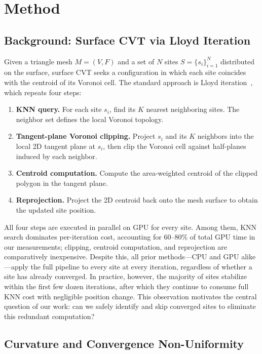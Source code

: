 \section{Method}
\label{sec:method}

\subsection{Background: Surface CVT via Lloyd Iteration}
\label{sec:background}

Given a triangle mesh $M = (V, F)$ and a set of $N$ sites $S = \{s_i\}_{i=1}^N$ distributed on the surface, surface CVT seeks a configuration in which each site coincides with the centroid of its Voronoi cell. The standard approach is Lloyd iteration~\cite{lloyd1982}, which repeats four steps:

\begin{enumerate}
    \item \textbf{KNN query.} For each site $s_i$, find its $K$ nearest neighboring sites. The neighbor set defines the local Voronoi topology.
    \item \textbf{Tangent-plane Voronoi clipping.} Project $s_i$ and its $K$ neighbors into the local 2D tangent plane at $s_i$, then clip the Voronoi cell against half-planes induced by each neighbor.
    \item \textbf{Centroid computation.} Compute the area-weighted centroid of the clipped polygon in the tangent plane.
    \item \textbf{Reprojection.} Project the 2D centroid back onto the mesh surface to obtain the updated site position.
\end{enumerate}

All four steps are executed in parallel on GPU for every site. Among them, KNN search dominates per-iteration cost, accounting for 60--80\% of total GPU time in our measurements; clipping, centroid computation, and reprojection are comparatively inexpensive. Despite this, all prior methods---CPU and GPU alike---apply the full pipeline to every site at every iteration, regardless of whether a site has already converged. In practice, however, the majority of sites stabilize within the first few dozen iterations, after which they continue to consume full KNN cost with negligible position change. This observation motivates the central question of our work: can we safely identify and skip converged sites to eliminate this redundant computation?

\subsection{Curvature and Convergence Non-Uniformity}
\label{sec:curvature_convergence}

